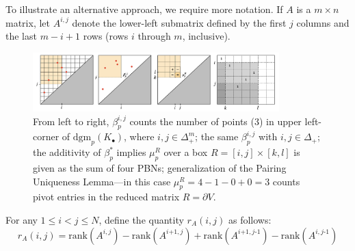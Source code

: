 \documentclass[10pt]{article}
\numberwithin{equation}{section}
\newcommand{\+}{%
	\raisebox{0.18ex}{\scaleobj{0.55}{+}}
}
\theoremstyle{definition}
\begin{document}
To illustrate an alternative approach, we require more notation. If $A$ is a $m \times n$ matrix, let $A^{i, j}$ denote the lower-left submatrix defined by the first $j$ columns and the last $m - i + 1$ rows (rows $i$ through $m$, inclusive). 
\begin{figure}
\centering
	\includegraphics[width=0.85\textwidth]{betti_add}
	\caption{From left to right, $\beta_p^{i,j}$ counts the number of points (3) in upper left-corner of $\mathrm{dgm}_p(K_\bullet)$, where $i,j \in \Delta_+^m$; the same $\beta_p^{i,j}$  with $i,j \in \Delta_+$; the additivity of $\beta_p^{\ast}$ implies $\mu_p^{R}$ over a box $R=[i,j] \times [k,l]$ is given as the sum of four PBNs; generalization of the Pairing Uniqueness Lemma---in this case 	$\mu_p^R = 4 - 1 - 0 + 0 = 3$ counts pivot entries in the reduced matrix $R = \partial V$.}
	\label{fig:mult}
\end{figure}
For any $1 \leq i < j \leq N$, define the quantity $r_A(i,j)$ as follows:
\begin{equation}
	r_A(i,j) = \mathrm{rank}(A^{i,j}) - \mathrm{rank}(A^{i\texttt{+}1,j}) + \mathrm{rank}(A^{i\texttt{+}1,j\text{-}1}) - \mathrm{rank}(A^{i,j\text{-}1})
\end{equation}
\end{document}
